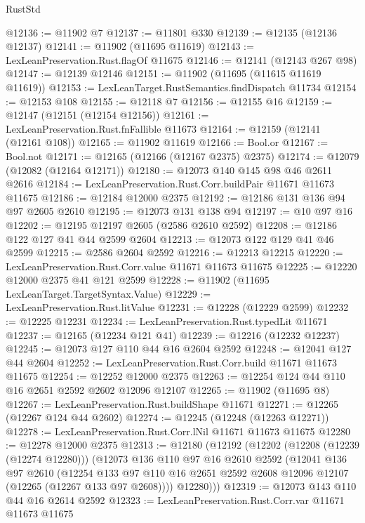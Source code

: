 \begin{lexlean}{RustStd}
\begin{coremodule}
@12136 := @11902 @7
@12137 := @11801 @330
@12139 := @12135 (@12136 @12137)
@12141 := @11902 (@11695 @11619)
@12143 := LexLeanPreservation.Rust.flagOf @11675
@12146 := @12141 (@12143 @267 @98)
@12147 := @12139 @12146
@12151 := @11902 (@11695 (@11615 @11619 @11619))
@12153 := LexLeanTarget.RustSemantics.findDispatch @11734
@12154 := @12153 @108
@12155 := @12118 @7
@12156 := @12155 @16
@12159 := @12147 (@12151 (@12154 @12156))
@12161 := LexLeanPreservation.Rust.fnFallible @11673
@12164 := @12159 (@12141 (@12161 @108))
@12165 := @11902 @11619
@12166 := Bool.or
@12167 := Bool.not
@12171 := @12165 (@12166 (@12167 @2375) @2375)
@12174 := @12079 (@12082 (@12164 @12171))
@12180 := @12073 @140 @145 @98 @46 @2611 @2616
@12184 := LexLeanPreservation.Rust.Corr.buildPair @11671 @11673 @11675
@12186 := @12184 @12000 @2375
@12192 := @12186 @131 @136 @94 @97 @2605 @2610
@12195 := @12073 @131 @138 @94
@12197 := @10 @97 @16
@12202 := @12195 @12197 @2605 (@2586 @2610 @2592)
@12208 := @12186 @122 @127 @41 @44 @2599 @2604
@12213 := @12073 @122 @129 @41 @46 @2599
@12215 := @2586 @2604 @2592
@12216 := @12213 @12215
@12220 := LexLeanPreservation.Rust.Corr.value @11671 @11673 @11675
@12225 := @12220 @12000 @2375 @41 @121 @2599
@12228 := @11902 (@11695 LexLeanTarget.TargetSyntax.Value)
@12229 := LexLeanPreservation.Rust.litValue
@12231 := @12228 (@12229 @2599)
@12232 := @12225 @12231
@12234 := LexLeanPreservation.Rust.typedLit @11671
@12237 := @12165 (@12234 @121 @41)
@12239 := @12216 (@12232 @12237)
@12245 := @12073 @127 @110 @44 @16 @2604 @2592
@12248 := @12041 @127 @44 @2604
@12252 := LexLeanPreservation.Rust.Corr.build @11671 @11673 @11675
@12254 := @12252 @12000 @2375
@12263 := @12254 @124 @44 @110 @16 @2651 @2592 @2602 @12096 @12107
@12265 := @11902 (@11695 @8)
@12267 := LexLeanPreservation.Rust.buildShape @11671
@12271 := @12265 (@12267 @124 @44 @2602)
@12274 := @12245 (@12248 (@12263 @12271))
@12278 := LexLeanPreservation.Rust.Corr.lNil @11671 @11673 @11675
@12280 := @12278 @12000 @2375
@12313 := @12180
    (@12192
      (@12202
        (@12208 (@12239 (@12274 @12280)))
        (@12073
          @136
          @110
          @97
          @16
          @2610
          @2592
          (@12041
            @136
            @97
            @2610
            (@12254
              @133
              @97
              @110
              @16
              @2651
              @2592
              @2608
              @12096
              @12107
              (@12265 (@12267 @133 @97 @2608))))
          @12280)))
@12319 := @12073 @143 @110 @44 @16 @2614 @2592
@12323 := LexLeanPreservation.Rust.Corr.var @11671 @11673 @11675

\end{coremodule}
\end{lexlean}
